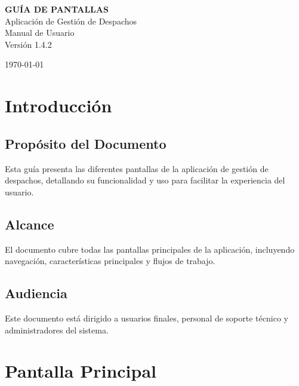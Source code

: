 \documentclass[12pt,a4paper]{report}
\begin{document}
\begin{titlepage}
    \centering
    \vspace*{2cm}
    
    {\Huge\bfseries\color{primary} GUÍA DE PANTALLAS}\\[0.5cm]
    {\LARGE\color{secondary} Aplicación de Gestión de Despachos}\\[2cm]
    
    
    {\Large Manual de Usuario}\\[1cm]
    {\large Versión 1.4.2}\\[2cm]
    
    \vfill
    
    {\large \today}
\end{titlepage}

\tableofcontents
\newpage

\chapter{Introducción}

\section{Propósito del Documento}
Esta guía presenta las diferentes pantallas de la aplicación de gestión de despachos, detallando su funcionalidad y uso para facilitar la experiencia del usuario.

\section{Alcance}
El documento cubre todas las pantallas principales de la aplicación, incluyendo navegación, características principales y flujos de trabajo.

\section{Audiencia}
Este documento está dirigido a usuarios finales, personal de soporte técnico y administradores del sistema.

\chapter{Pantalla Principal}
\end{document}
